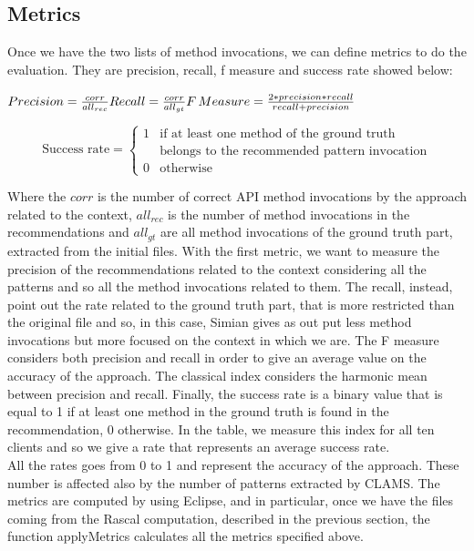 \subsection{Metrics}
Once we have the two lists of method invocations, we can define metrics to do the evaluation. They are precision, recall,  f measure and success rate showed below:\\


\begingroup

\fontsize{15pt}{24pt}\selectfont
\noindent
$ Precision =  \frac{corr}{all_{rec}}\\  
\\
Recall  = \frac{corr}{all_{gt}} \\  
\\
F\,Measure =\frac{2*precision*recall}{recall+precision}\\
$

\begin{equation}
 \text{Success rate} =
    \begin{cases}
      1 & \text{if at least one method of the ground truth }\\
      & \text{belongs to the recommended pattern invocation}\\      
      0 & \text{otherwise}
    \end{cases}       
\end{equation}

\endgroup



Where the $corr$ is the number of correct API method invocations by the approach related to the context, $all_{rec}$ is the number of method invocations in the recommendations and $all_{gt}$ are all method invocations of the ground truth part, extracted from the initial files. With the first metric, we want to measure the precision of the recommendations related to the context considering all the patterns and so all the method invocations related to them. The recall, instead, point out the rate related to the ground truth part, that is more restricted than the original file and so, in this case, Simian gives as out put less method invocations but more focused on the context in which we are. The F measure considers both precision and recall in order to give an average value on the accuracy of the approach. The classical index considers the harmonic mean between precision and recall. Finally, the success rate is a binary value that is equal to 1 if at least one method in the ground truth is found in the recommendation, 0 otherwise. In the table, we measure this index for all ten clients and so we give a rate that represents an average success rate.\\
All the rates goes from 0 to 1 and represent the accuracy of the approach. These number is affected also by the number of patterns extracted by CLAMS. The metrics are computed by using Eclipse, and in particular, once we have the files coming from the Rascal computation, described in the previous section, the function applyMetrics calculates all the metrics specified above.

